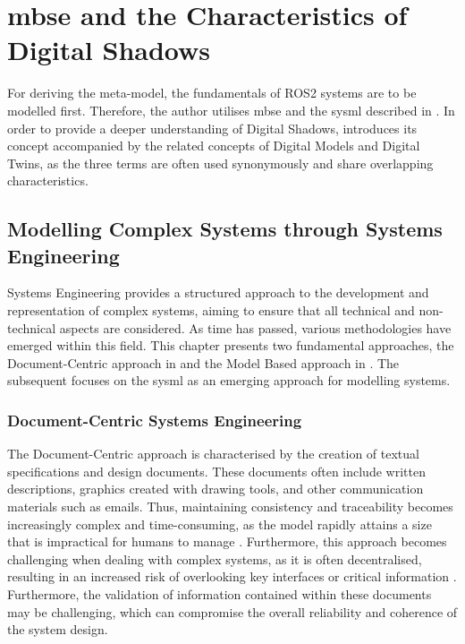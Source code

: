 \cleardoublepage
\chapter{\acl{mbse} and the Characteristics of Digital Shadows} \label{chap:fundamentals}

For deriving the meta-model, the fundamentals of ROS2 systems are to be modelled first. Therefore, the author utilises \acl{mbse} and the \acf{sysml} described in . In order to provide a deeper understanding of Digital Shadows,  introduces its concept accompanied by the related concepts of Digital Models and Digital Twins, as the three terms are often used synonymously and share overlapping characteristics.

\section{Modelling Complex Systems through Systems Engineering} \label{sec:systemmodelling}
Systems Engineering provides a structured approach to the development and representation of complex systems, aiming to ensure that all technical and non-technical aspects are considered. As time has passed, various methodologies have emerged within this field.
This chapter presents two fundamental approaches, the Document-Centric approach in  and the Model Based approach in . The subsequent  focuses on the \acf{sysml} as an emerging approach for modelling systems.


    \subsection{Document-Centric Systems Engineering} \label{subsec:DBSE}
    The Document-Centric approach is characterised by the creation of textual specifications and design documents. These documents often include written descriptions, graphics created with drawing tools, and other communication materials such as emails. Thus, maintaining consistency and traceability becomes increasingly complex and time-consuming, as the model rapidly attains a size that is impractical for humans to manage \cite[p.~234]{IIOTinsightsByDS}. Furthermore, this approach becomes challenging when dealing with complex systems, as it is often decentralised, resulting in an increased risk of overlooking key interfaces or critical information \cite[p.~173]{MBSEmotivation_state_opportunities}. Furthermore, the validation of information contained within these documents may be challenging, which can compromise the overall reliability and coherence of the system design. \cite[p.~15]{book:practicalGuideToSysML}

